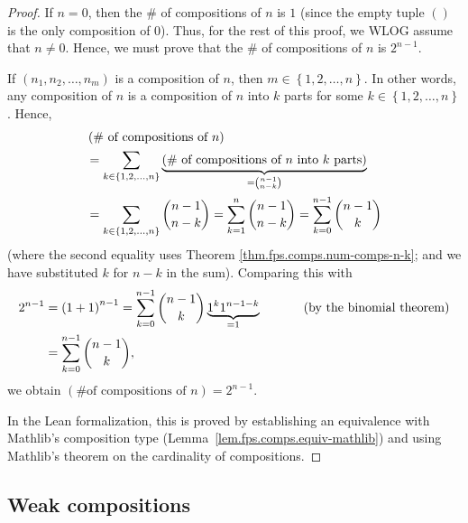 \begin{proof}
If $n=0$, then
the \# of compositions of $n$ is $1$ (since the empty tuple $\left(
{}\right)  $ is the only composition of $0$). Thus, for the rest of this
proof, we WLOG assume that $n\neq0$. Hence, we must prove that the \# of
compositions of $n$ is $2^{n-1}$.

If $\left(  n_{1},n_{2},\ldots,n_{m}\right)  $ is a composition of $n$, then
$m\in\left\{  1,2,\ldots,n\right\}  $. In other words, any composition
of $n$ is a composition of $n$ into $k$ parts for some $k\in\left\{
1,2,\ldots,n\right\}  $. Hence,%
\begin{align*}
&  \left(  \text{\# of compositions of }n\right) \\
&  =\sum_{k\in\left\{  1,2,\ldots,n\right\}  }\underbrace{\left(  \text{\# of
compositions of }n\text{ into }k\text{ parts}\right)  }_{=\dbinom
{n-1}{n-k}}\\
&  =\sum_{k\in\left\{  1,2,\ldots,n\right\}  }\dbinom{n-1}{n-k}=\sum_{k=1}%
^{n}\dbinom{n-1}{n-k}=\sum_{k=0}^{n-1}\dbinom{n-1}{k}%
\end{align*}
(where the second equality uses Theorem \ref{thm.fps.comps.num-comps-n-k};
and we have substituted $k$ for $n-k$ in the sum). Comparing this with%
\begin{align*}
2^{n-1}  &  =\left(  1+1\right)  ^{n-1}=\sum_{k=0}^{n-1}\dbinom{n-1}%
{k}\underbrace{1^{k}1^{n-1-k}}_{=1}\ \ \ \ \ \ \ \ \ \ \left(  \text{by the
binomial theorem}\right) \\
&  =\sum_{k=0}^{n-1}\dbinom{n-1}{k},
\end{align*}
we obtain $\left(  \text{\# of compositions of }n\right)  =2^{n-1}$.

In the Lean formalization, this is proved by establishing an equivalence with
Mathlib's composition type (Lemma~\ref{lem.fps.comps.equiv-mathlib})
and using Mathlib's theorem on the cardinality of compositions.
\end{proof}

\subsection{Weak compositions}

